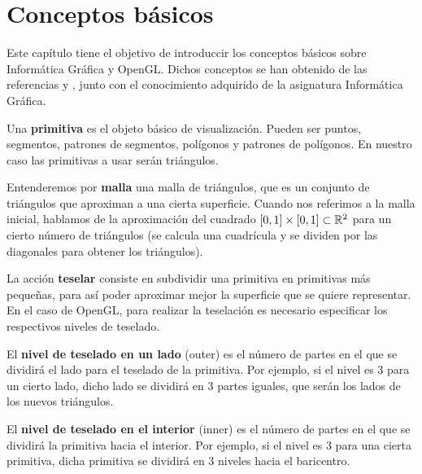 
\chapter{Conceptos básicos}

Este capítulo tiene el objetivo de introduccir los conceptos básicos sobre Informática Gráfica y OpenGL. Dichos conceptos se han obtenido de las referencias \cite{KhronosWiki} y \cite{LearnOGL}, junto con el conocimiento adquirido de la asignatura Informática Gráfica.

\begin{definicion} Una \textbf{primitiva} es el objeto básico de visualización. Pueden ser puntos, segmentos, patrones de segmentos, polígonos y patrones de polígonos. En nuestro caso las primitivas a usar serán triángulos.
\end{definicion}

\begin{definicion} Entenderemos por \textbf{malla} una malla de triángulos, que es un conjunto de triángulos que aproximan a una cierta superficie. Cuando nos referimos a la malla inicial, hablamos de la aproximación del cuadrado $[0,1]\times[0,1]\subset \mathbb{R}^2$ para un cierto número de triángulos (se calcula una cuadrícula y se dividen por las diagonales para obtener los triángulos).
\end{definicion}

\begin{definicion} La acción \textbf{teselar} consiste en subdividir una primitiva en primitivas más pequeñas, para así poder aproximar mejor la superficie que se quiere representar. En el caso de OpenGL, para realizar la teselación es necesario especificar los respectivos niveles de teselado.
\end{definicion}

\begin{definicion} El \textbf{nivel de teselado en un lado} (outer) es el número de partes en el que se dividirá el lado para el teselado de la primitiva. Por ejemplo, si el nivel es $3$ para un cierto lado, dicho lado se dividirá en $3$ partes iguales, que serán los lados de los nuevos triángulos.
\end{definicion}

\begin{definicion} El \textbf{nivel de teselado en el interior} (inner) es el número de partes en el que se dividirá la primitiva hacia el interior. Por ejemplo, si el nivel es $3$ para una cierta primitiva, dicha primitiva se dividirá en $3$ niveles hacia el baricentro.
\end{definicion}

